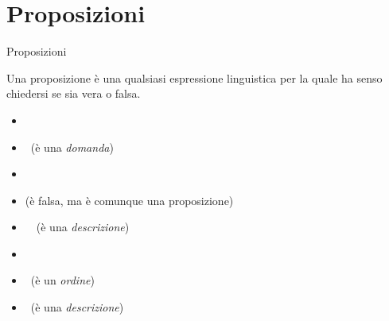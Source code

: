 \documentclass[aspectratio=169,10pt,dvipsnames,handout]{beamer}
\begin{document}
\section{Proposizioni}

\begin{frame}{Proposizioni}
	\begin{definition}
		Una \alert{proposizione} è una qualsiasi espressione linguistica per la quale ha senso chiedersi se sia \alert{vera} o \alert{falsa}.
	\end{definition}
	\begin{example}
		\begin{itemize}
			\item {} \pause \checkmark
			\item {} \pause \xmark\ (è una \emph{domanda})
			\item {} \pause  \checkmark
			\item {} \pause \checkmark (è falsa, ma è comunque una proposizione)
			\item {} \pause \ \xmark \ (è una \emph{descrizione})
			\item {} \pause \checkmark
			\item {} \pause \xmark \ (è un \emph{ordine})
			\item {} \pause \xmark \ (è una \emph{descrizione})
		\end{itemize}
	\end{example}
\end{frame}
\end{document}
